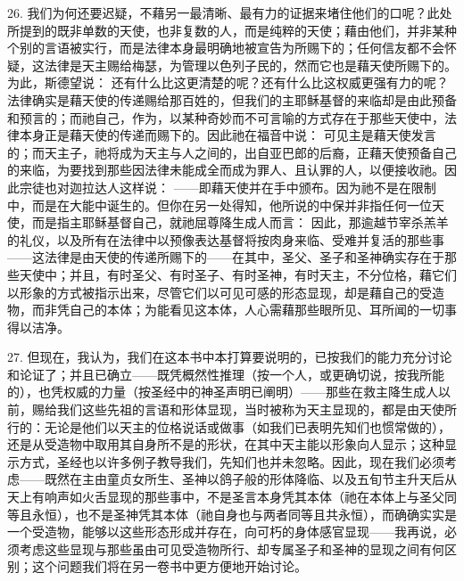 26. 我们为何还要迟疑，不藉另一最清晰、最有力的证据来堵住他们的口呢？此处所提到的既非单数的天使，也非复数的人，而是纯粹的天使；藉由他们，并非某种个别的言语被实行，而是法律本身最明确地被宣告为所赐下的；任何信友都不会怀疑，这法律是天主赐给梅瑟，为管理以色列子民的，然而它也是藉天使所赐下的。为此，斯德望说： 还有什么比这更清楚的呢？还有什么比这权威更强有力的呢？法律确实是藉天使的传递赐给那百姓的，但我们的主耶稣基督的来临却是由此预备和预言的；而祂自己，作为，以某种奇妙而不可言喻的方式存在于那些天使中，法律本身正是藉天使的传递而赐下的。因此祂在福音中说： 可见主是藉天使发言的；而天主子，祂将成为天主与人之间的，出自亚巴郎的后裔，正藉天使预备自己的来临，为要找到那些因法律未能成全而成为罪人、且认罪的人，以便接收祂。因此宗徒也对迦拉达人这样说： ——即藉天使并在手中颁布。因为祂不是在限制中，而是在大能中诞生的。但你在另一处得知，他所说的中保并非指任何一位天使，而是指主耶稣基督自己，就祂屈尊降生成人而言： 因此，那逾越节宰杀羔羊的礼仪，以及所有在法律中以预像表达基督将按肉身来临、受难并复活的那些事——这法律是由天使的传递所赐下的——在其中，圣父、圣子和圣神确实存在于那些天使中；并且，有时圣父、有时圣子、有时圣神，有时天主，不分位格，藉它们以形象的方式被指示出来，尽管它们以可见可感的形态显现，却是藉自己的受造物，而非凭自己的本体；为能看见这本体，人心需藉那些眼所见、耳所闻的一切事得以洁净。\par

27. 但现在，我认为，我们在这本书中本打算要说明的，已按我们的能力充分讨论和论证了；并且已确立——既凭概然性推理（按一个人，或更确切说，按我所能的），也凭权威的力量（按圣经中的神圣声明已阐明）——那些在救主降生成人以前，赐给我们这些先祖的言语和形体显现，当时被称为天主显现的，都是由天使所行的：无论是他们以天主的位格说话或做事（如我们已表明先知们也惯常做的），还是从受造物中取用其自身所不是的形状，在其中天主能以形象向人显示；这种显示方式，圣经也以许多例子教导我们，先知们也并未忽略。因此，现在我们必须考虑——既然在主由童贞女所生、圣神以鸽子般的形体降临、以及五旬节主升天后从天上有响声如火舌显现的那些事中，不是圣言本身凭其本体（祂在本体上与圣父同等且永恒），也不是圣神凭其本体（祂自身也与两者同等且共永恒），而确确实实是一个受造物，能够以这些形态形成并存在，向可朽的身体感官显现——我再说，必须考虑这些显现与那些虽由可见受造物所行、却专属圣子和圣神的显现之间有何区别；这个问题我们将在另一卷书中更方便地开始讨论。\par


